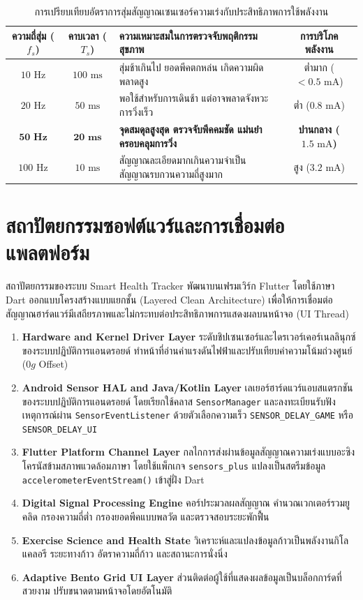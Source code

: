 \begin{table}[H]
\centering
\caption{การเปรียบเทียบอัตราการสุ่มสัญญาณเซนเซอร์ความเร่งกับประสิทธิภาพการใช้พลังงาน}
\label{tab:sensor_sampling_rates}
\small
\begin{tabularx}{\textwidth}{|c|c|X|c|}
\toprule
\textbf{ความถี่สุ่ม ($f_s$)} & \textbf{คาบเวลา ($T_s$)} & \textbf{ความเหมาะสมในการตรวจจับพฤติกรรมสุขภาพ} & \textbf{การบริโภคพลังงาน} \\
\midrule
$10\text{ Hz}$ & $100\text{ ms}$ & สุ่มช้าเกินไป ยอดพีคตกหล่น เกิดความผิดพลาดสูง & ต่ำมาก ($<0.5\text{ mA}$) \\
$20\text{ Hz}$ & $50\text{ ms}$ & พอใช้สำหรับการเดินช้า แต่อาจพลาดจังหวะการวิ่งเร็ว & ต่ำ ($0.8\text{ mA}$) \\
$\mathbf{50\text{ Hz}}$ & $\mathbf{20\text{ ms}}$ & \textbf{จุดสมดุลสูงสุด ตรวจจับพีคคมชัด แม่นยำ ครอบคลุมการวิ่ง} & \textbf{ปานกลาง ($1.5\text{ mA}$)} \\
$100\text{ Hz}$ & $10\text{ ms}$ & สัญญาณละเอียดมากเกินความจำเป็น สัญญาณรบกวนความถี่สูงมาก & สูง ($3.2\text{ mA}$) \\
\bottomrule
\end{tabularx}
\end{table}

\section{สถาปัตยกรรมซอฟต์แวร์และการเชื่อมต่อแพลตฟอร์ม}
สถาปัตยกรรมของระบบ Smart Health Tracker พัฒนาบนเฟรมเวิร์ก Flutter โดยใช้ภาษา Dart ออกแบบโครงสร้างแบบแยกชั้น (Layered Clean Architecture) เพื่อให้การเชื่อมต่อสัญญาณฮาร์ดแวร์มีเสถียรภาพและไม่กระทบต่อประสิทธิภาพการแสดงผลบนหน้าจอ (UI Thread)

\begin{enumerate}
    \item \textbf{Hardware and Kernel Driver Layer} ระดับชิปเซนเซอร์และไดรเวอร์เคอร์เนลลินุกซ์ของระบบปฏิบัติการแอนดรอยด์ ทำหน้าที่อ่านค่าแรงดันไฟฟ้าและปรับเทียบค่าความโน้มถ่วงศูนย์ ($0g$ Offset)
    \item \textbf{Android Sensor HAL and Java/Kotlin Layer} เลเยอร์ฮาร์ดแวร์แอบสแตรกชันของระบบปฏิบัติการแอนดรอยด์ โดยเรียกใช้คลาส \texttt{SensorManager} และลงทะเบียนรับฟังเหตุการณ์ผ่าน \texttt{SensorEventListener} ด้วยตัวเลือกความเร็ว \texttt{SENSOR\_DELAY\_GAME} หรือ \texttt{SENSOR\_DELAY\_UI}
    \item \textbf{Flutter Platform Channel Layer} กลไกการส่งผ่านข้อมูลสัญญาณความเร่งแบบอะซิงโครนัสข้ามสภาพแวดล้อมภาษา โดยใช้แพ็กเกจ \texttt{sensors\_plus} แปลงเป็นสตรีมข้อมูล \texttt{accelerometerEventStream()} เข้าสู่ฝั่ง Dart
    \item \textbf{Digital Signal Processing Engine} คอร์ประมวลผลสัญญาณ คำนวณเวกเตอร์รวมยูคลิด กรองความถี่ต่ำ กรองยอดพีคแบบพลวัต และตรวจสอบระยะพักฟื้น
    \item \textbf{Exercise Science and Health State} วิเคราะห์และแปลงข้อมูลก้าวเป็นพลังงานกิโลแคลอรี ระยะทางก้าว อัตราความถี่ก้าว และสถานะการนั่งนิ่ง
    \item \textbf{Adaptive Bento Grid UI Layer} ส่วนติดต่อผู้ใช้ที่แสดงผลข้อมูลเป็นบล็อกการ์ดที่สวยงาม ปรับขนาดตามหน้าจอโดยอัตโนมัติ
\end{enumerate}

